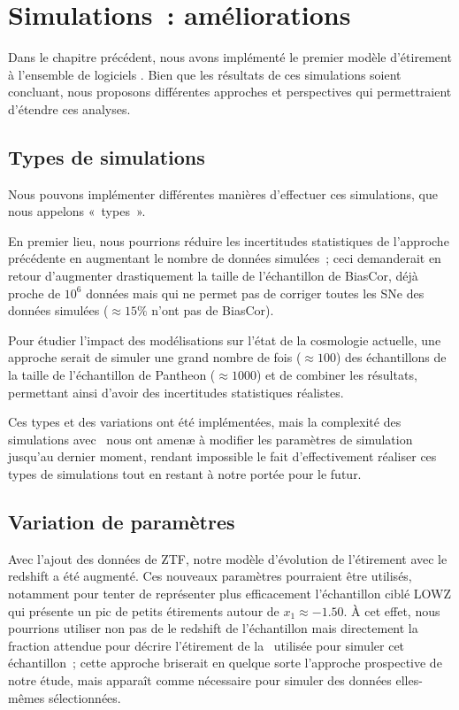 \documentclass[../main/main.tex]{subfiles}
\begin{document}
\section{Simulations~: améliorations}\label{sec:simpersp}

Dans le chapitre précédent, nous avons implémenté le premier modèle d'étirement
à l'ensemble de logiciels \snana. Bien que les résultats de ces simulations
soient concluant, nous proposons différentes approches et perspectives qui
permettraient d'étendre ces analyses.

\subsection{Types de simulations}\label{ssec:types}

Nous pouvons implémenter différentes manières d'effectuer ces simulations, que
nous appelons «~types~».

En premier lieu, nous pourrions réduire les incertitudes statistiques de
l'approche précédente en augmentant le nombre de données simulées~; ceci
demanderait en retour d'augmenter drastiquement la taille de l'échantillon de
BiasCor, déjà proche de $10^6$ données mais qui ne permet pas de corriger toutes
les SNe des données simulées ($\approx 15\%$ n'ont pas de BiasCor).

Pour étudier l'impact des modélisations sur l'état de la cosmologie actuelle,
une approche serait de simuler une grand nombre de fois ($\approx \num{100}$)
des échantillons de la taille de l'échantillon de Pantheon ($\approx
\num{1000}$) et de combiner les résultats, permettant ainsi d'avoir des
incertitudes statistiques réalistes.

Ces types et des variations ont été implémentées, mais la complexité des
simulations avec \snana\ nous ont amenæ à modifier les paramètres de simulation
jusqu'au dernier moment, rendant impossible le fait d'effectivement réaliser ces
types de simulations tout en restant à notre portée pour le futur.

\subsection{Variation de paramètres}\label{ssec:pvar}

Avec l'ajout des données de ZTF, notre modèle d'évolution de l'étirement avec le
redshift a été augmenté. Ces nouveaux paramètres pourraient être utilisés,
notamment pour tenter de représenter plus efficacement l'échantillon ciblé LOWZ
qui présente un pic de petits étirements autour de $x_1 \approx -1.50$. À cet
effet, nous pourrions utiliser non pas de le redshift de l'échantillon mais
directement la fraction attendue pour décrire l'étirement de la \hostlib\
utilisée pour simuler cet échantillon~; cette approche briserait en quelque
sorte l'approche prospective de notre étude, mais apparaît comme nécessaire pour
simuler des données elles-mêmes sélectionnées.
\end{document}
